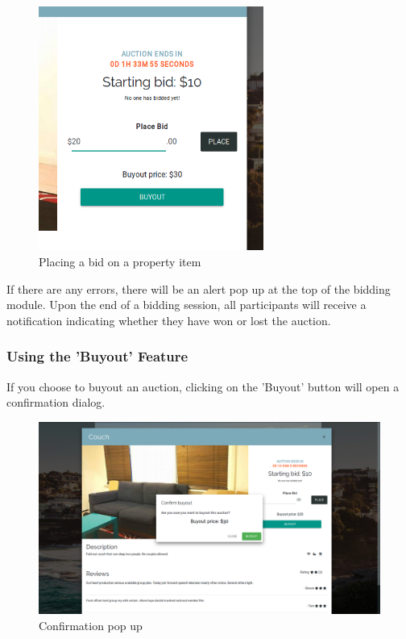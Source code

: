 \begin{figure}[!h]
  \centering
  \includegraphics[height=8cm]{assets/userManual/biddingModule.png}
  \caption{Placing a bid on a property item}
  \label{fig:biddingModule}
\end{figure}

If there are any errors, there will be an alert pop up at the top of the
bidding module. Upon the end of a bidding session, all participants will receive
a notification indicating whether they have won or lost the auction.

\newpage
\subsubsection{Using the 'Buyout' Feature}
If you choose to buyout an auction, clicking on the 'Buyout' button will open
a confirmation dialog.

\begin{figure}[!h]
  \includegraphics[width=\linewidth]{assets/userManual/buyoutConfirm.png}
  \caption{Confirmation pop up}
  \label{fig:buyoutConfirm}
\end{figure}

